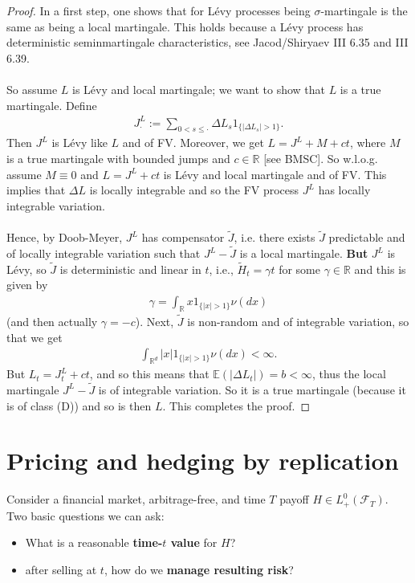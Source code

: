 \documentclass[12pt,a4paper, twoside]{article}
\theoremstyle{definition}
\begin{document}
\begin{proof}
In a first step, one shows that for Lévy processes being $\sigma$-martingale is the same as being a local martingale. This holds because a Lévy process has deterministic seminmartingale characteristics, see Jacod/Shiryaev III 6.35 and III 6.39.
\\\\So assume $L$ is Lévy and local martingale; we want to show that $L$ is a true martingale. Define
\begin{align*}
J_\cdot^L:= \sum_{0 < s \leq \cdot} \Delta L_s 1_{\{| \Delta L_s| > 1 \}}.
\end{align*}
Then $J^L$ is Lévy like $L$ and of FV. Moreover, we get $L=J^L + M + ct$, where $M$ is a true martingale with bounded jumps and $c \in \mathbb{R}$  [see BMSC]. So w.l.o.g. assume $M \equiv 0$ and $L=J^L + ct$ is Lévy and local martingale and of FV. This implies that $\Delta L$ is locally integrable and so the FV process $J^L$ has locally integrable variation. \\
\\
Hence, by Doob-Meyer, $J^L$ has compensator $\widetilde{J}$, i.e. there exists $\widetilde{J}$ predictable and of locally integrable variation such that $J^L- \widetilde{J}$ is a local martingale. \textbf{But} $J^L$ is Lévy, so $\widetilde{J}$ is deterministic and linear in $t$, i.e.,  $\widetilde{H}_t = \gamma t$ for some $\gamma \in \mathbb{R}$ and this is given by 
\begin{align*}
\gamma = \int_\mathbb{R} x 1_{\{ |x| > 1\}} \nu (dx)
\end{align*}
(and then actually $\gamma = -c$). 
\newpage
Next, $\widetilde{J}$ is non-random and of integrable variation, so that we get 
\begin{align*}
\int_{\mathbb{R}^d} |x|1_{\{ |x| >1\}} \nu(dx) < \infty.
\end{align*}
But $L_t= J_t^L + ct$, and so this means that $\mathbb{E}( | \Delta L_t|) = b < \infty$, thus the local martingale $J^L- \widetilde{J}$ is of integrable variation. So it is a true martingale (because it is of class (D)) and so is then $L$. This completes the proof. 
\end{proof}
\newpage
\section{Pricing and hedging by replication}
Consider a financial market, arbitrage-free, and time $T$ payoff $H \in L_+^0( \mathcal{F}_T)$. Two basic questions we can ask:
\begin{itemize}
\item What is a reasonable \textbf{time-$t$ value} for $H$?
\item after selling at $t$, how do we \textbf{manage resulting risk}?
\end{itemize}
\end{document}
